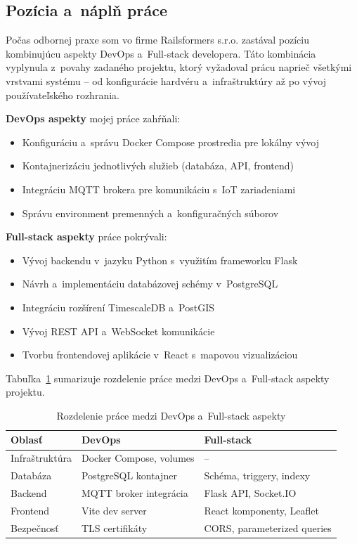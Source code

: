\subsection{Pozícia a~náplň práce}
\label{sec:Pozice}

Počas odbornej praxe som vo firme Railsformers s.r.o. zastával pozíciu kombinujúcu aspekty DevOps a~Full-stack developera. Táto kombinácia vyplynula z~povahy zadaného projektu, ktorý vyžadoval prácu naprieč všetkými vrstvami systému -- od konfigurácie hardvéru a~infraštruktúry až po vývoj používateľského rozhrania.

\textbf{DevOps aspekty} mojej práce zahŕňali:
\begin{itemize}
    \item Konfiguráciu a~správu Docker Compose prostredia pre lokálny vývoj
    \item Kontajnerizáciu jednotlivých služieb (databáza, API, frontend)
    \item Integráciu MQTT brokera pre komunikáciu s~IoT zariadeniami
    \item Správu environment premenných a~konfiguračných súborov
\end{itemize}

\textbf{Full-stack aspekty} práce pokrývali:
\begin{itemize}
    \item Vývoj backendu v~jazyku Python s~využitím frameworku Flask
    \item Návrh a~implementáciu databázovej schémy v~PostgreSQL
    \item Integráciu rozšírení TimescaleDB a~PostGIS
    \item Vývoj REST API a~WebSocket komunikácie
    \item Tvorbu frontendovej aplikácie v~React s~mapovou vizualizáciou
\end{itemize}

Tabuľka~\ref{tab:aspekty} sumarizuje rozdelenie práce medzi DevOps a~Full-stack aspekty projektu.

\begin{table}[htbp]
    \centering
    \begin{tabular}{|l|l|l|}
        \hline
        \textbf{Oblasť} & \textbf{DevOps} & \textbf{Full-stack} \\
        \hline
        Infraštruktúra & Docker Compose, volumes & -- \\
        Databáza & PostgreSQL kontajner & Schéma, triggery, indexy \\
        Backend & MQTT broker integrácia & Flask API, Socket.IO \\
        Frontend & Vite dev server & React komponenty, Leaflet \\
        Bezpečnosť & TLS certifikáty & CORS, parameterized queries \\
        \hline
    \end{tabular}
    \caption{Rozdelenie práce medzi DevOps a~Full-stack aspekty}
    \label{tab:aspekty}
\end{table}

